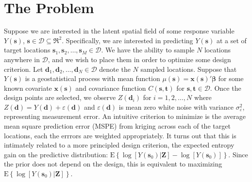 \documentclass[12pt]{article}
\newcommand{\E}{\mathrm{E}}
\begin{document}
\section{The Problem}
Suppose we are interested in the latent spatial field of some response variable $Y(\bm{s})$, $\bm{s}\in \mathcal{D}\subseteq \Re^2$. Specifically, we are interested in predicting $Y(\bm{s})$ at a set of target locations $\bm{s}_1, \bm{s}_2, \dots, \bm{s}_M\in\mathcal{D}$. We have the ability to sample $N$ locations anywhere in $\mathcal{D}$, and we wish to place them in order to optimize some design criterion. Let $\bm{d}_1, \bm{d}_2, \dots, \bm{d}_N\in\mathcal{D}$ denote the $N$ sampled locations. Suppose that $Y(\bm{s})$ is a geostatistical process with mean function $\mu(\bm{s})=\bm{x}(\bm{s})'\bm{\beta}$ for some known covariate $\bm{x}(\bm{s})$ and covariance function $C(\bm{s}, \bm{t})$ for $\bm{s},\bm{t}\in\mathcal{D}$. Once the design points are selected, we observe $Z(\bm{d}_i)$ for $i=1,2,\dots,N$ where $Z(\bm{d}) = Y(\bm{d}) + \varepsilon(\bm{d})$ and $\varepsilon(\bm{d})$ is mean zero white noise with variance $\sigma^2_{\varepsilon}$, representing measurement error. An intuitive criterion to minimize is the average mean square prediction error (MSPE) from kriging across each of the target locations, each the errrors are weighted appropriately. It turns out that this is intimately related to a more principled design criterion, the expected entropy gain on the predictive distribution: $\E\left\{\log[Y(\bm{s}_0)|\bm{Z}] - \log[Y(\bm{s}_0)]\right\}$. Since the prior does not depend on the design, this is equivalent to maximizing $\E\left\{\log[Y(\bm{s}_0)|\bm{Z}]\right\}$.
\end{document}
